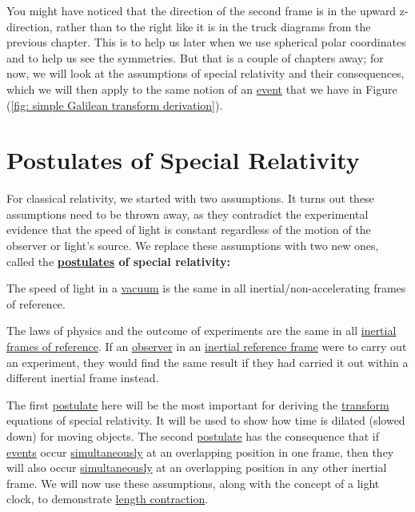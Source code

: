 You might have noticed that the direction of the second frame is in the upward z-direction, rather than to the right like it is in the truck diagrams from the previous chapter.
This is to help us later when we use spherical polar coordinates and to help us see the symmetries.
But that is a couple of chapters away; for now, we will look at the assumptions of special relativity and their consequences, which we will then apply to the same notion of an \hyperlink{def-event}{event} that we have in Figure (\ref{fig: simple Galilean transform derivation}).

\section{Postulates of Special Relativity} \label{sect: Postulates of Special Relativity}

For classical relativity, we started with two assumptions.
It turns out these assumptions need to be thrown away, as they contradict the experimental evidence that the speed of light is constant regardless of the motion of the observer or light's source.
We replace these assumptions with two new ones, called the \textbf{\hyperlink{def-postulates}{postulates} of special relativity:}

\begin{mainpoints}
	\item The speed of light in a \hyperlink{def-vacuum}{vacuum} is the same in all inertial/non-accelerating frames of reference.
	\item The laws of physics and the outcome of experiments are the same in all \hyperlink{def-Inertial-reference-frame}{inertial frames of reference}. If an \hyperlink{def-observer}{observer} in an \hyperlink{def-Inertial-reference-frame}{inertial reference frame} were to carry out an experiment, they would find the same result if they had carried it out within a different inertial frame instead.
\end{mainpoints}

The first \hyperlink{def-postulates}{postulate} here will be the most important for deriving the \hyperlink{def-transform}{transform} equations of special relativity.
It will be used to show how time is dilated (slowed down) for moving objects.
The second \hyperlink{def-postulates}{postulate} has the consequence that if \hyperlink{def-event}{events} occur \hyperlink{def-simultaneity}{simultaneously} at an overlapping position in one frame, then they will also occur \hyperlink{def-simultaneity}{simultaneously} at an overlapping position in any other inertial frame.
We will now use these assumptions, along with the concept of a light clock, to demonstrate \hyperlink{def-length-contraction}{length contraction}.

